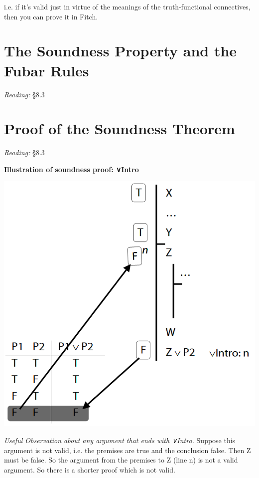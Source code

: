 \documentclass[12pt]{extarticle}
\begin{document}
\begin{multicols*}{3}
\hspace{3mm} i.e. if it’s valid just in virtue of the meanings of the truth-functional connectives, then you can prove it in Fitch.
 
 
 
\section{The Soundness Property and the Fubar Rules}
 
\emph{Reading:} §8.3
 
 
 
\section{Proof of the Soundness Theorem}
 
\emph{Reading:} §8.3
 
\begin{minipage}{\columnwidth}
 
\textbf{Illustration of soundness proof: ∨Intro}
 
\begin{center}
\includegraphics[scale=0.3]{img/soundness_or.png}
\end{center}
\end{minipage}
 
\emph{Useful Observation about any argument that ends with ∨Intro.} Suppose this argument is not valid, i.e. the premises are true and the conclusion false. Then Z must be false. So the argument from the premises to Z (line n) is not a valid argument. So there is a shorter proof which is not valid.
 

\end{multicols*}
\end{document}
